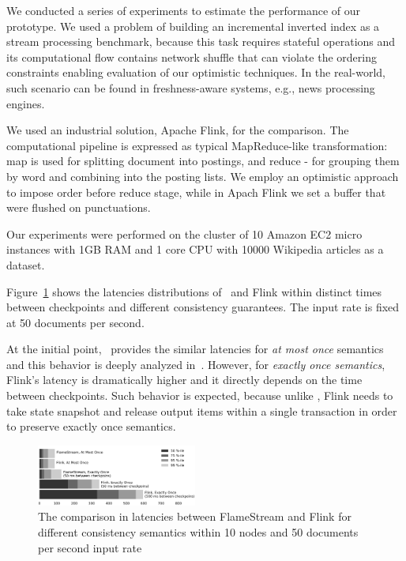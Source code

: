 \label {fs-short-experiments}

We conducted a series of experiments to estimate the performance of our prototype. We used a problem of building an incremental inverted index as a stream processing benchmark, because this task requires stateful operations and its computational flow contains network shuffle that can violate the ordering constraints enabling evaluation of our optimistic techniques. In the real-world, such scenario can be found in freshness-aware systems, e.g., news processing engines.

We used an industrial solution, Apache Flink, for the comparison. The computational pipeline is expressed as typical MapReduce-like transformation: map is used for splitting document into postings, and reduce - for grouping them by word and combining into the posting lists. We employ an optimistic approach to impose order before reduce stage, while in Apach Flink we set a buffer that were flushed on punctuations.

Our experiments were performed on the cluster of 10 Amazon EC2 micro instances with 1GB RAM and 1 core CPU with 10000 Wikipedia articles as a dataset.

Figure~\ref{performance} shows the latencies distributions of \FlameStream\ and Flink within distinct times between checkpoints and different consistency guarantees. The input rate is fixed at 50 documents per second.

At the initial point, \FlameStream\ provides the similar latencies for {\it at most once} semantics and this behavior is deeply analyzed in~\cite{we2018seim}. However, for {\it exactly once semantics}, Flink's latency is dramatically higher and it directly depends on the time between checkpoints. Such behavior is expected, because unlike \FlameStream, Flink needs to take state snapshot and release output items within a single transaction in order to preserve exactly once semantics.

\begin{figure}[htbp]
  \centering
  \includegraphics[width=0.47\textwidth]{pics/comparison}
  \caption{The comparison in latencies between FlameStream and Flink for different consistency semantics within 10 nodes and 50 documents per second input rate}
  \label {performance}
\end{figure}
